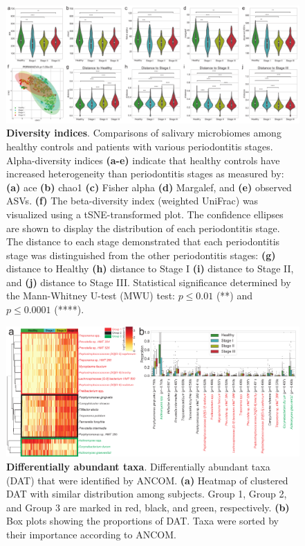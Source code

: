 \documentclass[11pt, a4paper, onecolumn, oneside]{report}
\begin{document}
            \begin{figure}[p]
                \centering
                \includegraphics[width=15 cm]{Figures/Periodontitis/Figure_1.pdf}
                \caption[Diversity indices]{\textbf{Diversity indices}. Comparisons of salivary microbiomes among healthy controls and patients with various periodontitis stages. Alpha-diversity indices \textbf{(a-e)} indicate that healthy controls have increased heterogeneity than periodontitis stages as measured by: \textbf{(a)} ace \textbf{(b)} chao1 \textbf{(c)} Fisher alpha \textbf{(d)} Margalef, and \textbf{(e)} observed ASVs. \textbf{(f)} The beta-diversity index (weighted UniFrac) was visualized using a tSNE-transformed plot. The confidence ellipses are shown to display the distribution of each periodontitis stage. The distance to each stage demonstrated that each periodontitis stage was distinguished from the other periodontitis stages: \textbf{(g)} distance to Healthy \textbf{(h)} distance to Stage I \textbf{(i)} distance to Stage II, and \textbf{(j)} distance to Stage III. Statistical significance determined by the Mann-Whitney U-test (MWU) test: $p \le 0.01$ (**) and $p \le 0.0001$ (****).}
                \label{fig:Periodontitis-diveristy}
            \end{figure}
            \clearpage

            \begin{figure}[p]
                \centering
                \includegraphics[width=15 cm]{Figures/Periodontitis/Figure_2.pdf}
                \caption[Differentially abundant taxa]{\textbf{Differentially abundant taxa}. Differentially abundant taxa (DAT) that were identified by ANCOM. \textbf{(a)} Heatmap of clustered DAT with similar distribution among subjects. Group 1, Group 2, and Group 3 are marked in red, black, and green, respectively. \textbf{(b)} Box plots showing the proportions of DAT. Taxa were sorted by their importance according to ANCOM.}
                \label{fig:Periodontitis-DAT}
            \end{figure}
            \clearpage
\end{document}

